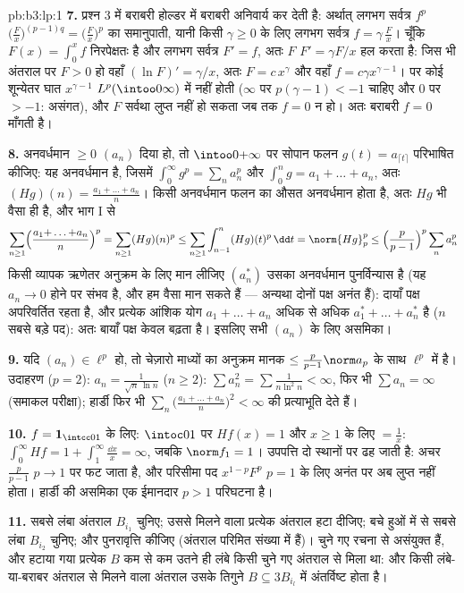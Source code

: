 \begin{solution}{pb:b3:lp:1}
\textbf{7.} प्रश्न 3 में बराबरी होल्डर में बराबरी अनिवार्य कर देती
है: अर्थात् लगभग सर्वत्र $f^p$ $\bigl(\frac Fx\bigr)^{(p-1)q}
= \bigl(\frac Fx\bigr)^p$ का समानुपाती, यानी किसी $\gamma \geq 0$
के लिए लगभग सर्वत्र $f = \gamma\,\frac Fx$। चूँकि $F(x) = \int_0^xf$ निरपेक्षतः  है और लगभग
सर्वत्र $F' = f$, अतः $F$ $F' =
\gamma F/x$ हल करता है: जिस भी अंतराल पर $F > 0$
हो वहाँ $(\ln F)' =
\gamma/x$, अतः $F = c\,x^{\gamma}$ और वहाँ $f = c\gamma
x^{\gamma - 1}$। पर कोई शून्येतर घात $x^{\gamma-1}$
$L^p(\intoo0\infty)$ में नहीं होती ($\infty$ पर $p(\gamma - 1) < -1$ चाहिए और $0$ पर $> -1$: असंगत),
और $F$ सर्वथा लुप्त नहीं हो सकता जब तक $f = 0$ न हो। अतः बराबरी
$f =
0$ माँगती है।

\textbf{8.} अनवर्धमान $\geq 0$ $(a_n)$ दिया हो, तो $\intoo0{+\infty}$ पर सोपान फलन
$g(t) = a_{\lceil t\rceil}$ परिभाषित कीजिए: यह अनवर्धमान है, जिसमें $\int_0^\infty g^p =
\sum_na_n^p$ और $\int_0^ng = a_1 + \dots + a_n$, अतः
$(Hg)(n) = \frac{a_1 + \dots + a_n}n$। किसी अनवर्धमान फलन का औसत अनवर्धमान होता है, अतः $Hg$ भी
वैसा ही है, और भाग I से
\[
\sum_{n\geq1}\Bigl(\frac{a_1{+}\dots{+}a_n}n\Bigr)^p
= \sum_{n\geq1}(Hg)(n)^p
\leq \sum_{n\geq1}\int_{n-1}^n (Hg)(t)^p\,\dd t
= \norm{Hg}_p^p
\leq \Bigl(\frac p{p-1}\Bigr)^p\sum_n a_n^p
\]
किसी व्यापक ऋणेतर अनुक्रम के लिए मान लीजिए $(a_n^*)$ उसका अनवर्धमान
पुनर्विन्यास है (यह $a_n \to 0$ होने पर संभव है, और हम वैसा मान सकते हैं
--- अन्यथा दोनों पक्ष अनंत हैं): दायाँ पक्ष अपरिवर्तित रहता है, और
प्रत्येक आंशिक योग $a_1 + \dots
+ a_n$ अधिक से अधिक $a_1^* + \dots + a_n^*$ है ($n$ सबसे बड़े पद):
अतः बायाँ पक्ष केवल बढ़ता है। इसलिए सभी $(a_n)$ के लिए असमिका।

\textbf{9.} यदि $(a_n) \in \ell^p$ हो, तो चेज़ारो माध्यों का अनुक्रम मानक $\leq \frac p{p-1}\norm
a_p$
के साथ $\ell^p$ में है। उदाहरण ($p = 2$): $a_n = \frac1{\sqrt n\,\ln n}$ ($n
\geq 2$): $\sum a_n^2 = \sum\frac1{n\ln^2n} < \infty$, फिर भी
$\sum a_n = \infty$ (समाकल परीक्षा); हार्डी फिर भी $\sum_n\bigl(\frac{a_1 + \dots + a_n}n\bigr)^2 < \infty$ की प्रत्याभूति देते हैं।

\textbf{10.} $f = \mathbf 1_{\intcc01}$ के लिए: $\intoc01$ पर $Hf(x) = 1$ और $x \geq 1$ के लिए $= \frac1x$:
$\int_0^\infty Hf =
1 + \int_1^\infty\frac{\dd x}x = \infty$, जबकि $\norm f_1 =
1$। उपपत्ति दो स्थानों पर ढह जाती है: अचर $\frac p{p-1}$ $p \to 1$
पर फट जाता है, और परिसीमा पद $x^{1-p}F^p$ $p = 1$ के लिए अनंत पर अब लुप्त
नहीं होता। हार्डी की असमिका एक ईमानदार $p > 1$ परिघटना है।

\textbf{11.} सबसे लंबा अंतराल $B_{i_1}$ चुनिए; उससे मिलने वाला प्रत्येक
अंतराल हटा दीजिए; बचे हुओं में से सबसे लंबा $B_{i_2}$ चुनिए; और पुनरावृत्ति
कीजिए (अंतराल परिमित संख्या में हैं)। चुने गए रचना से असंयुक्त हैं,
और हटाया गया प्रत्येक $B$ कम से कम उतने ही लंबे किसी चुने गए अंतराल
से मिला था: और किसी लंबे-या-बराबर अंतराल से मिलने वाला अंतराल उसके
तिगुने $B \subseteq
3B_{i_l}$ में अंतर्विष्ट होता है।


\end{solution}
